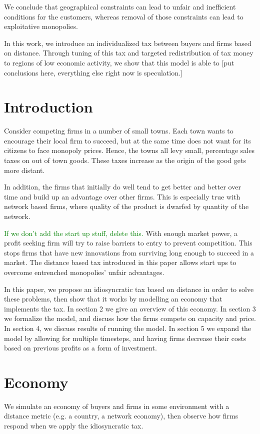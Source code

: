 \documentclass[11pt]{article}
\newcommand{\green}[1]{\textcolor{Green}{#1}} %
\begin{document}
We conclude that geographical constraints can lead to unfair and inefficient
conditions for the customers, whereas removal of those constraints can lead to
exploitative monopolies.

In this work, we introduce an individualized tax between buyers and firms based
on distance. Through tuning of this tax and targeted redistribution of tax
money to regions of low economic activity, we show that this model is able to
[put conclusions here, everything else right now is speculation.]

\section{Introduction}
Consider competing firms in a number of small towns. Each town wants to
encourage their local firm to succeed, but at the same time does not want for
its citizens to face monopoly prices. Hence, the towns all levy small,
percentage sales taxes on out of town goods. These taxes increase as the origin
of the good gets more distant.

In addition, the firms that initially do well tend to get better and better
over time and build up an advantage over other firms. This is especially true
with network based firms, where quality of the product is dwarfed by quantity
of the network. 

\green{If we don't add the start up stuff, delete this.}
With enough market power, a profit seeking firm will try to raise barriers to
entry to prevent competition. This stops firms that have new innovations from
surviving long enough to succeed in a market. The distance based tax introduced
in this paper allows start ups to overcome entrenched monopolies' unfair
advantages.

In this paper, we propose an idiosyncratic tax based on distance in order to
solve these problems, then show that it works by modelling an economy that
implements the tax. In section 2 we give an overview of this economy. In
section 3 we formalize the model, and discuss how the firms compete on capacity
and price. In section 4, we discuss results of running the model. In section 5
we expand the model by allowing for multiple timesteps, and having firms
decrease their costs based on previous profits as a form of investment.

\section{Economy}
We simulate an economy of buyers and firms in some environment with a distance
metric (e.g. a country, a network economy), then observe how firms respond when
we apply the idiosyncratic tax.
\end{document}
